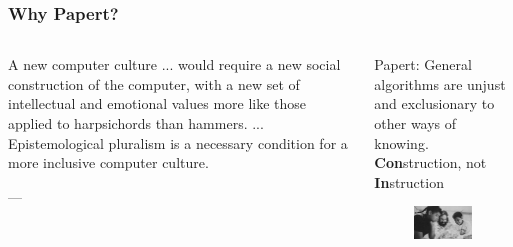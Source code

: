 \documentclass{beamer}
\begin{document}
\begin{frame}
    \frametitle{Why Papert?}
    
    \begin{columns}
        \begin{column}{0.5\textwidth}
        \begin{displayquote}
            A new computer culture ... would require a new social construction of the computer, with a new set of intellectual and emotional values more like those applied to harpsichords than hammers. ... Epistemological pluralism is a necessary condition for a more inclusive computer culture.
    
            --- \cite{turkleEpistemologicalPluralismStyles1990}
        \end{displayquote}
        \end{column}    
        \begin{column}{0.5\textwidth}
            Papert: General algorithms are unjust and exclusionary to other ways of knowing. \textbf{Con}struction, not \textbf{In}struction
            \begin{figure}[t]
                \includegraphics[width=\textwidth]{figure/Papert_with_children_and_robot.jpg}
                \centering
            \end{figure}
        \end{column}
    \end{columns}
\end{frame}
\end{document}
